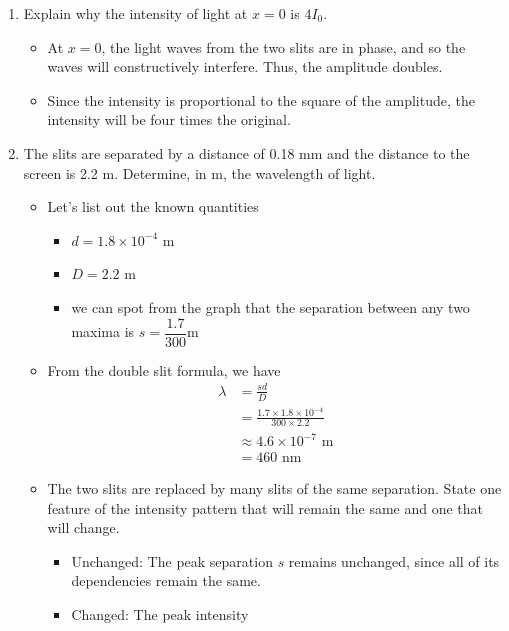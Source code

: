 \documentclass[a4paper,12pt]{article}
\begin{document}
\begin{enumerate}[label=(\alph*)]
        \begin{enumerate}[label=(\roman*)]
          \item Explain why the intensity of light at $x=0$ is $4I_0$.
                \begin{itemize}
                  \item At $x = 0$, the light waves from the two slits are in phase, and so the waves will constructively interfere. Thus, the amplitude doubles.
                  \item Since the intensity is proportional to the square of the amplitude, the intensity will be four times the original.
                \end{itemize}
          \item The slits are separated by a distance of 0.18 mm and the distance to the screen is 2.2 m. Determine, in m, the wavelength of light.
                \begin{itemize}
                  \item Let's list out the known quantities
                        \begin{itemize}
                          \item $d = 1.8 \times 10^{-4}$ m
                          \item $D = 2.2$ m
                          \item we can spot from the graph that the separation between any two maxima is $s = \dfrac{1.7}{300}$m
                        \end{itemize}
                  \item From the double slit formula, we have
                        \begin{align*}
                          \lambda & = \frac{sd}{D}                                     \\
                                  & = \frac{1.7\times1.8 \times 10^{-4}}{300\times2.2} \\
                                  & \approx4.6 \times 10^{-7} \text{ m}                \\
                                  & = 460 \text{ nm}
                        \end{align*}
                  \item The two slits are replaced by many slits of the same separation. State one feature of the intensity pattern that will remain the same and one that will change.
                        \begin{itemize}
                          \item Unchanged: The peak separation $s$ remains unchanged, since all of its dependencies remain the same.
                          \item Changed: The peak intensity
                        \end{itemize}
                \end{itemize}
        \end{enumerate}

\end{enumerate}
\end{document}
